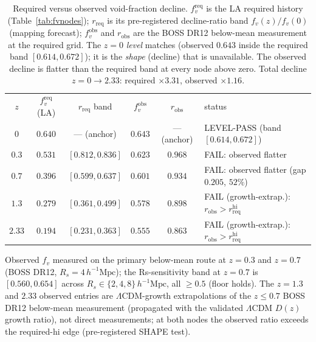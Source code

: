 \documentclass[aps,prd,twocolumn,nofootinbib,superscriptaddress,floatfix]{revtex4-2}
\newcommand{\Lcdm}{\Lambda\mathrm{CDM}}
\newcommand{\hmpc}{\,h^{-1}\mathrm{Mpc}}
\begin{document}
\begin{table}[t]
\caption{Required versus observed void-fraction decline. $f_v^{\mathrm{req}}$ is
the LA required history (Table~\ref{tab:fvnodes}); $r_{\mathrm{req}}$ is its
pre-registered decline-ratio band $f_v(z)/f_v(0)$ (mapping forecast);
$f_v^{\mathrm{obs}}$ and $r_{\mathrm{obs}}$ are the BOSS DR12 below-mean
measurement at the required grid. The $z=0$ \emph{level} matches (observed
$0.643$ inside the required band $[0.614,0.672]$); it is the \emph{shape}
(decline) that is unavailable. The observed decline is flatter than the required
band at every node above zero. Total decline $z\!=\!0\!\to\!2.33$: required
$\times3.31$, observed $\times1.16$.}
\label{tab:decline}
\begin{ruledtabular}
\begin{tabular}{cccccl}
$z$ & $f_v^{\mathrm{req}}$ (LA) & $r_{\mathrm{req}}$ band & $f_v^{\mathrm{obs}}$ & $r_{\mathrm{obs}}$ & status\\
\colrule
$0$    & $0.640$ & --- (anchor)       & $0.643$ & --- (anchor) & LEVEL-PASS (band $[0.614,0.672]$)\\
$0.3$  & $0.531$ & $[0.812,0.836]$     & $0.623$ & $0.968$      & FAIL: observed flatter\\
$0.7$  & $0.396$ & $[0.599,0.637]$     & $0.601$ & $0.934$      & FAIL: observed flatter (gap $0.205$, $52\%$)\\
$1.3$  & $0.279$ & $[0.361,0.499]$     & $0.578$ & $0.898$      & FAIL (growth-extrap.): $r_{\mathrm{obs}}>r_{\mathrm{req}}^{\mathrm{hi}}$\\
$2.33$ & $0.194$ & $[0.231,0.363]$     & $0.555$ & $0.863$      & FAIL (growth-extrap.): $r_{\mathrm{obs}}>r_{\mathrm{req}}^{\mathrm{hi}}$\\
\end{tabular}
\end{ruledtabular}
\footnotesize Observed $f_v$ measured on the primary below-mean route at $z=0.3$
and $z=0.7$ (BOSS DR12, $R_s=4\hmpc$); the Rs-sensitivity band at $z=0.7$ is
$[0.560,0.654]$ across $R_s\in\{2,4,8\}\hmpc$, all $\ge0.5$ (floor holds). The
$z=1.3$ and $2.33$ observed entries are $\Lcdm$-growth extrapolations of the
$z\le0.7$ BOSS DR12 below-mean measurement (propagated with the validated $\Lcdm$
$D(z)$ growth ratio), not direct measurements; at both nodes the observed ratio
exceeds the required-hi edge (pre-registered SHAPE test).
\end{table}
\end{document}
